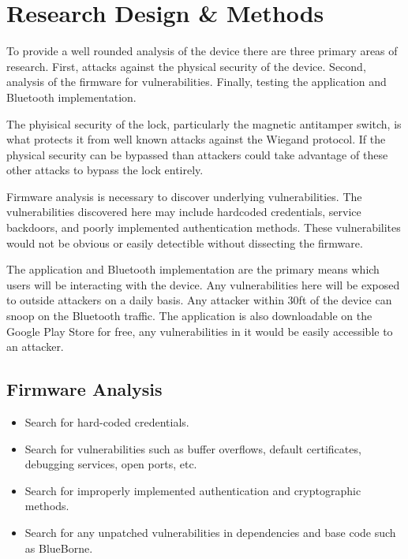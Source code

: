 \documentclass[10pt,twocolumn,letterpaper]{article}
\begin{document}

\section{Research Design \& Methods}
To provide a well rounded analysis of the device there are three primary areas of research.  First, attacks against the physical security of the device.  Second, analysis of the firmware for vulnerabilities.  Finally, testing the application and Bluetooth implementation.

The phyisical security of the lock, particularly the magnetic antitamper switch, is what protects it from well known attacks against the Wiegand protocol.  If the physical security can be bypassed than attackers could take advantage of these other attacks to bypass the lock entirely.

Firmware analysis is necessary to discover underlying vulnerabilities.  The vulnerabilities discovered here may include hardcoded credentials, service backdoors, and poorly implemented authentication methods.  These vulnerabilites would not be obvious or easily detectible without dissecting the firmware.

The application and Bluetooth implementation are the primary means which users will be interacting with the device.  Any vulnerabilities here will be exposed to outside attackers on a daily basis.  Any attacker within 30ft of the device can snoop on the Bluetooth traffic.  The application is also downloadable on the Google Play Store for free, any vulnerabilities in it would be easily accessible to an attacker.

\subsection{Firmware Analysis}
\begin{itemize}
    \item Search for hard-coded credentials.
    \item Search for vulnerabilities such as buffer overflows, default certificates, debugging services, open ports, etc.
    \item Search for improperly implemented authentication and cryptographic methods.
    \item Search for any unpatched vulnerabilities in dependencies and base code such as BlueBorne.
\end{itemize}
\end{document}
